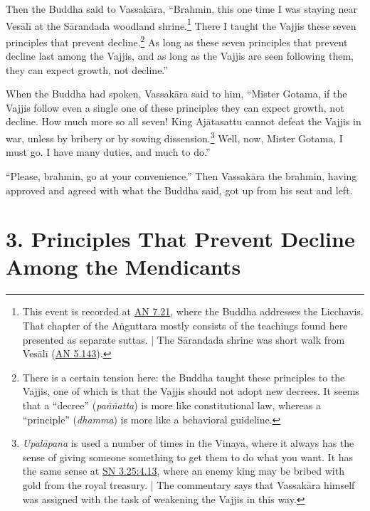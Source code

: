 \documentclass[12pt,openany]{book}%
\begin{document}
Then the Buddha said to \textsanskrit{Vassakāra}, “Brahmin, this one time I was staying near \textsanskrit{Vesālī} at the \textsanskrit{Sārandada} woodland shrine.\footnote{This event is recorded at \href{https://suttacentral.net/an7.21/en/sujato}{AN 7.21}, where the Buddha addresses the Licchavis. That chapter of the \textsanskrit{Aṅguttara} mostly consists of the teachings found here presented as separate suttas. | The \textsanskrit{Sārandada} shrine was short walk from \textsanskrit{Vesālī} (\href{https://suttacentral.net/an5.143/en/sujato}{AN 5.143}). } There I taught the Vajjis these seven principles that prevent decline.\footnote{There is a certain tension here: the Buddha taught these principles to the Vajjis, one of which is that the Vajjis should not adopt new decrees. It seems that a “decree” (\textit{\textsanskrit{paññatta}}) is more like constitutional law, whereas a “principle” (\textit{dhamma}) is more like a behavioral guideline. } As long as these seven principles that prevent decline last among the Vajjis, and as long as the Vajjis are seen following them, they can expect growth, not decline.” 

When the Buddha had spoken, \textsanskrit{Vassakāra} said to him, “Mister Gotama, if the Vajjis follow even a single one of these principles they can expect growth, not decline. How much more so all seven! King \textsanskrit{Ajātasattu} cannot defeat the Vajjis in war, unless by bribery or by sowing dissension.\footnote{\textit{\textsanskrit{Upalāpana}} is used a number of times in the Vinaya, where it always has the sense of giving someone something to get them to do what you want. It has the same sense at \href{https://suttacentral.net/sn3.25/en/sujato\#4.13}{SN 3.25:4.13}, where an enemy king may be bribed with gold from the royal treasury. | The commentary says that \textsanskrit{Vassakāra} himself was assigned with the task of weakening the Vajjis in this way. } Well, now, Mister Gotama, I must go. I have many duties, and much to do.” 

“Please, brahmin, go at your convenience.” Then \textsanskrit{Vassakāra} the brahmin, having approved and agreed with what the Buddha said, got up from his seat and left. 

\section*{3. Principles That Prevent Decline Among the Mendicants }
\end{document}
